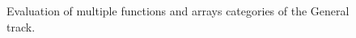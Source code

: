 \begin{figure}
	\noindent{}
	\caption{Evaluation of multiple functions and arrays categories of the General track.}
	\label{fig:mult-func-arr}
\end{figure}

